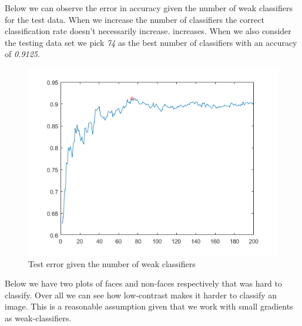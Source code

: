 \documentclass[a4paper,12pt]{article}
\begin{document}
Below we can observe the error in accuracy given the number of weak classifiers for the test data. When we increase the number of classifiers the correct classification rate doesn't necessarily increase. increases. When we also consider the testing data set we pick \textit{74} as the best number of classifiers with an accuracy of \textit{0.9125}.

\begin{figure}[H]
\centering
\caption{Test error given the number of weak classifiers}\label{fig:test_error}
  \begin{minipage}[]{0.80\textwidth}
  \includegraphics[width=\textwidth]{figures/test_error.png}
  \end{minipage}
\end{figure}

Below we have two plots of faces and non-faces respectively that was hard to classify. Over all we can see how low-contrast makes it harder to classify an image. This is a reasonable assumption given that we work with small gradients as weak-classifiers.
\end{document}
